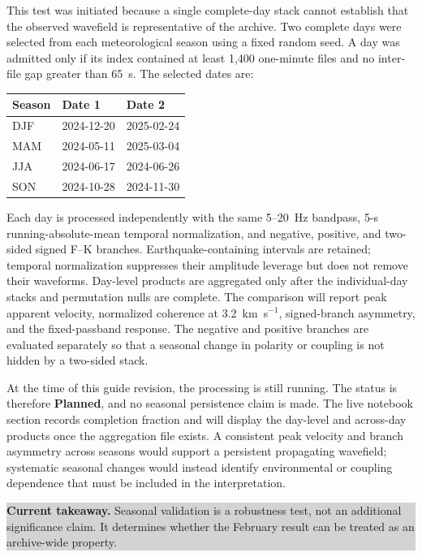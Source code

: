 \documentclass[11pt]{article}
\newcommand{\planned}{\textcolor{planned}{\textbf{Planned}}}
\newcommand{\takeaway}[1]{\par\smallskip\noindent\colorbox{lightgray}{\parbox{0.95\linewidth}{\textbf{Current takeaway.} #1}}\par\medskip}
\begin{document}
This test was initiated because a single complete-day stack cannot establish that the observed wavefield is representative of the archive. Two complete days were selected from each meteorological season using a fixed random seed. A day was admitted only if its index contained at least 1,400 one-minute files and no inter-file gap greater than 65~s. The selected dates are:

\begin{center}
\begin{tabular}{lll}
\toprule
Season & Date 1 & Date 2 \\
\midrule
DJF & 2024-12-20 & 2025-02-24 \\
MAM & 2024-05-11 & 2025-03-04 \\
JJA & 2024-06-17 & 2024-06-26 \\
SON & 2024-10-28 & 2024-11-30 \\
\bottomrule
\end{tabular}
\end{center}

Each day is processed independently with the same 5--20~Hz bandpass, 5-s running-absolute-mean temporal normalization, and negative, positive, and two-sided signed F--K branches. Earthquake-containing intervals are retained; temporal normalization suppresses their amplitude leverage but does not remove their waveforms. Day-level products are aggregated only after the individual-day stacks and permutation nulls are complete. The comparison will report peak apparent velocity, normalized coherence at 3.2~km~s$^{-1}$, signed-branch asymmetry, and the fixed-passband response. The negative and positive branches are evaluated separately so that a seasonal change in polarity or coupling is not hidden by a two-sided stack.

At the time of this guide revision, the processing is still running. The status is therefore \planned, and no seasonal persistence claim is made. The live notebook section records completion fraction and will display the day-level and across-day products once the aggregation file exists. A consistent peak velocity and branch asymmetry across seasons would support a persistent propagating wavefield; systematic seasonal changes would instead identify environmental or coupling dependence that must be included in the interpretation.

\takeaway{Seasonal validation is a robustness test, not an additional significance claim. It determines whether the February result can be treated as an archive-wide property.}
\end{document}
